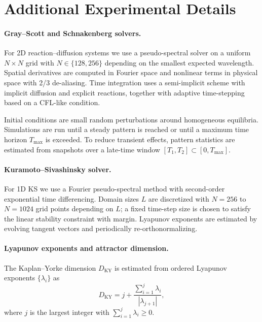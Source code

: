 \documentclass{article}
\theoremstyle{plain}
\theoremstyle{definition}
\theoremstyle{remark}
\begin{document}



\clearpage
\onecolumn
\appendix

\section{Additional Experimental Details}
\label{app:exp_details}

\paragraph{Gray--Scott and Schnakenberg solvers.}
For 2D reaction--diffusion systems we use a pseudo-spectral solver on a uniform $N\times N$ grid with $N\in\{128,256\}$ depending on the smallest expected wavelength. Spatial derivatives are computed in Fourier space and nonlinear terms in physical space with 2/3 de-aliasing. Time integration uses a semi-implicit scheme with implicit diffusion and explicit reactions, together with adaptive time-stepping based on a CFL-like condition.

Initial conditions are small random perturbations around homogeneous equilibria. Simulations are run until a steady pattern is reached or until a maximum time horizon $T_{\max}$ is exceeded. To reduce transient effects, pattern statistics are estimated from snapshots over a late-time window $[T_1,T_2]\subset[0,T_{\max}]$.

\paragraph{Kuramoto--Sivashinsky solver.}
For 1D KS we use a Fourier pseudo-spectral method with second-order exponential time differencing. Domain sizes $L$ are discretized with $N=256$ to $N=1024$ grid points depending on $L$; a fixed time-step size is chosen to satisfy the linear stability constraint with margin. Lyapunov exponents are estimated by evolving tangent vectors and periodically re-orthonormalizing.

\paragraph{Lyapunov exponents and attractor dimension.}
The Kaplan--Yorke dimension $D_{\mathrm{KY}}$ is estimated from ordered Lyapunov exponents $\{\lambda_i\}$ as
\[
D_{\mathrm{KY}} = j + \frac{\sum_{i=1}^{j}\lambda_i}{|\lambda_{j+1}|},
\]
where $j$ is the largest integer with $\sum_{i=1}^{j}\lambda_i \ge 0$.
\end{document}
